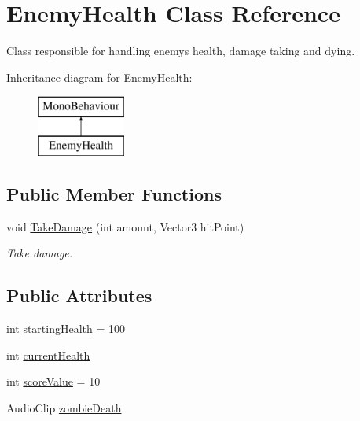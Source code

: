 \hypertarget{class_enemy_health}{}\section{Enemy\+Health Class Reference}
\label{class_enemy_health}


Class responsible for handling enemy\textquotesingle{}s health, damage taking and dying.  


Inheritance diagram for Enemy\+Health\+:\begin{figure}[H]
\begin{center}
\leavevmode
\includegraphics[height=2.000000cm]{class_enemy_health}
\end{center}
\end{figure}
\subsection*{Public Member Functions}
\begin{DoxyCompactItemize}
\item 
void \mbox{\hyperlink{class_enemy_health_aca32e53aac9208ea39dacf21667b0874}{Take\+Damage}} (int amount, Vector3 hit\+Point)
\begin{DoxyCompactList}\small\item\em Take damage. \end{DoxyCompactList}\end{DoxyCompactItemize}
\subsection*{Public Attributes}
\begin{DoxyCompactItemize}
\item 
int \mbox{\hyperlink{class_enemy_health_a38679a6db9f4c1a03512494520bd7016}{starting\+Health}} = 100
\item 
int \mbox{\hyperlink{class_enemy_health_a87d62a02a46acef77ee2cefbb7beda64}{current\+Health}}
\item 
int \mbox{\hyperlink{class_enemy_health_aeab937df3d3e723455502c690d811691}{score\+Value}} = 10
\item 
Audio\+Clip \mbox{\hyperlink{class_enemy_health_ae5142bed0489f598a666d283d7d6a311}{zombie\+Death}}
\end{DoxyCompactItemize}
